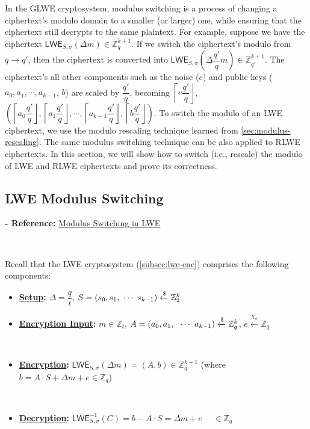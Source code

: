 In the GLWE cryptosystem, modulus switching is a process of changing a ciphertext's modulo domain to a smaller (or larger) one, while ensuring that the ciphertext still decrypts to the same plaintext. For example, suppose we have the ciphertext $\textsf{LWE}_{S, \sigma}(\Delta m) \in \mathbb{Z}_q^{k+1}$. If we switch the ciphertext's modulo from $q \rightarrow q'$, then the ciphertext is converted into $\textsf{LWE}_{S, \sigma}\left(\Delta\dfrac{q'}{q} m\right) \in \mathbb{Z}_{q'}^{k+1}$. The ciphertext's all other components such as the noise ($e$) and public keys ($a_0, a_1, \cdots, a_{k-1}$, $b$) are scaled by $\dfrac{q'}{q}$, becoming $\left\lceil e\dfrac{q'}{q} \right\rfloor$, $\left(\left\lceil a_0\dfrac{q'}{q}\right\rfloor, \left\lceil a_1\dfrac{q'}{q}\right\rfloor, \cdots, \left\lceil a_{k-1}\dfrac{q'}{q}\right\rfloor, \left\lceil b\dfrac{q'}{q}\right\rfloor\right)$. To switch the modulo of an LWE ciphertext, we use the modulo rescaling technique learned from \autoref{sec:modulus-rescaling}. 
The same modulus switching technique can be also applied to RLWE ciphertexts. In this section, we will show how to switch (i.e., rescale) the modulo of LWE and RLWE ciphertexts and prove its correctness.  


\subsection{LWE Modulus Switching}
\label{subsec:modulus-switch-lwe}

\textbf{- Reference:} 
\href{https://www.jeremykun.com/2022/07/16/modulus-switching-in-lwe/}{Modulus Switching in LWE}

$ $

Recall that the LWE cryptosystem (\autoref{subsec:lwe-enc}) comprises the following components:

\begin{itemize}
\item \textbf{\underline{Setup}:} $\Delta = \dfrac{q}{t}$, \text{ } $S = (s_0, s_1, \text{ } \text{$\cdots$} \text{ } s_{k-1}) \xleftarrow{\$} \mathbb{Z}_2^{k}$

\item \textbf{\underline{Encryption Input}:} $m \in \mathbb{Z}_t$, \text{ } $A = (a_0, a_1, \text{ } \text{ } \text{$\cdots$} \text{ } a_{k-1}) \xleftarrow{\$} \mathbb{Z}_q^{k}$, \text{ } $e \xleftarrow{\chi_\sigma} \mathbb{Z}_q$

$ $

\item \textbf{\underline{Encryption}:} $\textsf{LWE}_{S,\sigma}(\Delta  m) = (A, b) \in \mathbb{Z}_q^{k + 1}$ \text{ } (where $b = A \cdot S + \Delta  m + e \in \mathbb{Z}_q$)

$ $

\item \textbf{\underline{Decryption}:} $\textsf{LWE}^{-1}_{S,\sigma}(C) = b - A\cdot S = \Delta  m + e \text{ } \text{ } \in \mathbb{Z}_q$

\end{itemize}

